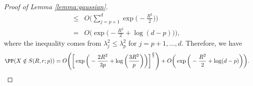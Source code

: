 \begin{proof}[Proof of Lemma \ref{lemma:gaussian}]
\begin{align*}
        \leq & O\bigg( \sum_{j=p+1}^d \exp\bigg( -\frac{R^2}{2} \bigg) \bigg)\\
        = & O\bigg( \exp\bigg( -\frac{R^2}{2}+\log(d-p) \bigg) \bigg),
    \end{align*}
    where the inequality comes from $\lambda_j^2 \leq \lambda_p^2$ for $j=p+1,\ldots,d$. Therefore, we have
    \begin{equation*}
        \PP(X \notin S(R,r;p) ) = O \Bigg( \bigg[ \exp \bigg(-\frac{2R^2}{3p} + \log\bigg( \frac{3R^2}{p} \bigg) \bigg) \bigg]^{\frac{p}{2}} \Bigg) + O\bigg( \exp\bigg( -\frac{R^2}{2}+\log(d-p) \bigg) \bigg).
    \end{equation*}  
    

\end{proof}
